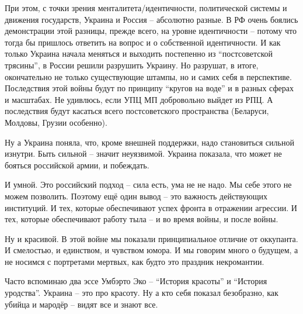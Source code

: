 При этом, с точки зрения менталитета/идентичности, политической системы и
движения государств, Украина и Россия – абсолютно разные. В РФ очень боялись
демонстрации этой разницы, прежде всего, на уровне идентичности – потому что
тогда бы пришлось ответить на вопрос и о собственной идентичности. И как только
Украина начала меняться и выходить постепенно из \enquote{постсоветской
трясины}, в России решили разрушить Украину. Но разрушат, в итоге, окончательно
не только существующие штампы, но и самих себя в перспективе. Последствия этой
войны будут по принципу \enquote{кругов на воде} и в разных сферах и масштабах.
Не удивлюсь, если УПЦ МП добровольно выйдет из РПЦ. А последствия будут
касаться всего постсоветского пространства (Беларуси, Молдовы, Грузии
особенно).

Ну а Украина поняла, что, кроме внешней поддержки, надо становиться сильной
изнутри. Быть сильной – значит неуязвимой. Украина показала, что может не
бояться российской армии, и побеждать.

И умной. Это российский подход – сила есть, ума не не надо. Мы себе этого не
можем позволить. Поэтому ещё один вывод – это важность действующих институций.
И тех, которые обеспечивают успех фронта в отражении агрессии. И тех, которые
обеспечивают работу тыла – и во время войны, и после войны.

Ну и красивой. В этой войне мы показали принципиальное отличие от оккупанта. И
смелостью, и единством, и чувством юмора. И мы говорим много о будущем, а не
носимся с портретами мертвых, как будто это праздник некромантии.

Часто вспоминаю два эссе Умбэрто Эко – \enquote{История красоты} и
\enquote{История уродства}.  Украина – это про красоту. Ну а кто себя показал
безобразно, как убийца и мародёр – видят все и знают все.
